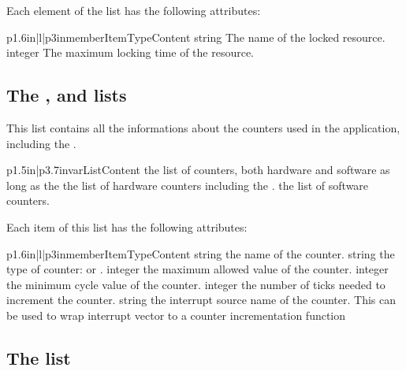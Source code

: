 Each element of the  list has the following attributes:

\begin{longtableiii}{p{1.6in}|l|p{3in}}{member}{Item}{Type}{Content}
  {string}
  {The name of the locked resource.}
  {integer}
  {The maximum locking time of the resource.}
\end{longtableiii}


\subsection{The ,  and  lists}

This list contains all the informations about the counters used in the application, including the .

\begin{longtableii}{p{1.5in}|p{3.7in}}{var}{List}{Content}
  {the list of counters, both hardware and software as long as the }
  {the list of hardware counters including the .}
  {the list of software counters.}
\end{longtableii}

Each item of this list has the following attributes:

\begin{longtableiii}{p{1.6in}|l|p{3in}}{member}{Item}{Type}{Content}
  {string}
  {the name of the counter.}
  {string}
  {the type of counter: {\small{}} or {\small{}}.}
  {integer}
  {the maximum allowed value of the counter.}
  {integer}
  {the minimum cycle value of the counter.}
  {integer}
  {the number of ticks needed to increment the counter.}
  {string}
  {the interrupt source name of the counter. This can be used to wrap interrupt vector to a counter incrementation function}
\end{longtableiii}

\subsection{The  list}

